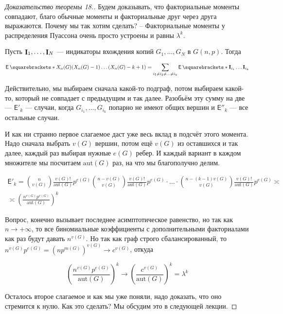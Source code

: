 \begin{proof}[Доказательство теоремы 18.]
  Будем доказывать, что факториальные моменты совпадают, благо обычные моменты
  и факториальные друг через друга выражаются. Почему мы так хотим сделать? 
  -- Факториальные моменты у распределения Пуассона очень просто устроены и равны
  $\lambda^k$.

  Пусть $\mathop{\mathbf{I}}_1, \ldots, \mathop{\mathbf{I}}_N$ --- индикаторы вхождения копий $G_1,\ldots,G_N$ в
  $G(n, p)$. Тогда 

  \[
    \E{X_n(G)(X_n(G) - 1)\ldots(X_n(G) - k + 1)} =
    \sum\limits_{i_1 \neq i_2 \neq \ldots \neq i_k} \E{\mathbf{I}_{i_1}
    \ldots\mathbf{I}_{i_k}}
  \]

  Действительно, мы выбираем сначала какой-то подграф, потом выбираем какой-то,
  который не совпадает с предыдущим и так далее. Разобьём эту сумму на две ---
  $\mathsf{E'}_k$ --- случаи, когда $G_{i_1},\ldots,G_{i_k}$ попарно не имеют
  общих вершин и $\mathsf{E''}_k$ --- все остальные случаи.

  И как ни странно первое слагаемое даст уже весь вклад в подсчёт этого момента.
  Надо сначала выбрать $v(G)$ вершин, потом ещё $v(G)$ из оставшихся и так далее,
  каждый раз выбирая нужные $e(G)$ ребер.
  И каждый вариант в каждом множителе мы посчитаем $\mathrm{aut}(G)$ раз, на что
  мы благополучно делим.

  \begin{multline}
    \mathsf{E'}_k = \binom{n}{v(G)}\frac{v(G)!}{\mathrm{aut}(G)}p^{e(G)}
    \binom{n - v(G)}{v(G)}\frac{v(G)!}{\mathrm{aut}(G)}p^{e(G)}\cdot\ldots\cdot
    \binom{n - (k - 1)v(G)}{v(G)}\frac{v(G)!}{\mathrm{aut}(G)}p^{e(G)} 
    \asymp\\\asymp
    \left(\frac{n^{v(G)}p^{e(G)}}{\mathrm{aut}(G)}\right)^k
  \end{multline}

  Вопрос, конечно вызывает последнее асимптотическое равенство, но так как 
  $n \to +\infty$, то все биномиальные коэффициенты с дополнительными
  факториалами как раз будут давать $n^{v(G)}$. Но так как граф строго 
  сбалансированный, то $n^{v(G)}p^{e(G)}= (np^{m(G)})^{v(G)} \to c^{v(G)}$, откуда

  \[
    \left(\frac{n^{v(G)}p^{e(G)}}{\mathrm{aut}(G)}\right)^k \to 
    \left(\frac{c^{v(G)}}{\mathrm{aut}(G)}\right)^k = \lambda^k
  \]

  Осталось второе слагаемое и как мы уже поняли, надо доказать, что оно
  стремится к нулю. Как это сделать? Мы обсудим это в следующей лекции.
\end{proof}
